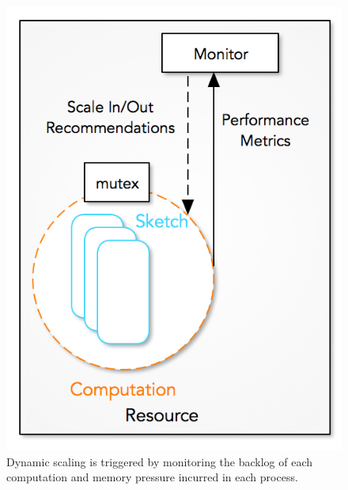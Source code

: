 \begin{figure}
    \centerline{\includegraphics[scale=0.55]{figures/process-monitor.png}}
    \caption{Dynamic scaling is triggered by monitoring the backlog of each computation and memory pressure incurred in each process.}
    \label{fig:process-monitor}
\end{figure}